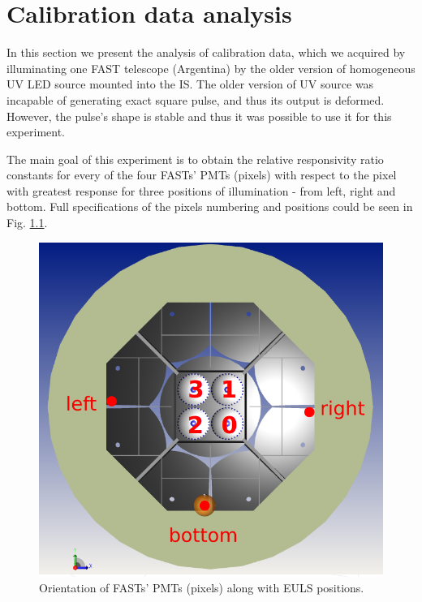 
\chapter{Calibration data analysis}
\label{chap7}
In this section we present the analysis of calibration data, which we acquired by illuminating one FAST telescope (Argentina) by the older version of homogeneous UV LED source mounted into the IS. The older version of UV source was incapable of generating exact square pulse, and thus its output is deformed. However, the pulse's shape is stable and thus it was possible to use it for this experiment.   

\par
The main goal of this experiment is to obtain the relative responsivity ratio constants for every of the four FASTs' PMTs (pixels) with respect to the pixel with greatest response for three positions of illumination - from left, right and bottom. Full specifications of the pixels numbering and positions could be seen in Fig. \ref{PMT orientation}.

\begin{figure}[H]
 \centering
 \includegraphics[scale=0.35, angle = 0]{./pictures/orientation2.png}
 \caption{Orientation of FASTs' PMTs (pixels) along with EULS positions.}
 \label{PMT orientation}
 
\end{figure}

